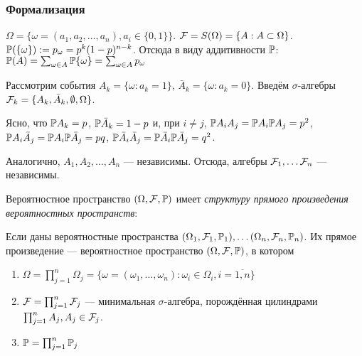 \subsubsection{Формализация}\label{ux444ux43eux440ux43cux430ux43bux438ux437ux430ux446ux438ux44f}

\({\Omega = \{ \omega = (a_1, a_2, \ldots, a_n), a_i\in \{0,1\} \}}\).\newline
\({\mathcal F = S(\Omega) = \{ A : A\subset\Omega\}}\).\newline
\({\mathbb P(\{\omega\}) := p_\omega = p^k (1-p)^{n-k}}\). Отсюда в виду
аддитивности \(\mathbb P\): \newline
\({\mathbb P(A) = \sum_{\omega\in A} \mathbb P \{\omega\} = \sum_{\omega\in A} p_{\omega}}\)

Рассмотрим события \(A_k = \{\omega: a_k = 1\}\),
\(\bar A_k = \{\omega: a_k = 0\}\).\newline
Введём \(\sigma\)-алгебры
\(\mathcal F_k = \{ A_k, \bar A_k, \emptyset, \Omega \}\).

Ясно, что \(\mathbb P A_k = p\), \(\mathbb P \bar A_k = 1-p\) и, при
\(i\neq j\),\newline
\(\mathbb P A_i A_j = \mathbb P A_i \mathbb P A_j = p^2\),\newline
\(\mathbb P A_i \bar A_j = \mathbb P A_i \mathbb P\bar A_j = pq\),\newline
\(\mathbb P \bar A_i \bar A_j = \mathbb P\bar A_i \mathbb P\bar A_j = q^2\).

Аналогично, \(A_1, A_2, \ldots, A_n\) --- независимы. Отсюда, алгебры
\(\mathcal F_1, \ldots \mathcal F_n\) --- независимы.

Вероятностное пространство \((\Omega,\mathcal F,\mathbb P)\) имеет
\emph{структуру прямого произведения вероятностных пространств}:

Если даны вероятностные пространства
\((\Omega_1, \mathcal F_1, \mathbb P_1), \ldots (\Omega_n, \mathcal F_n, \mathbb P_n)\).
Их прямое произведение --- вероятностное пространство
\((\Omega, \mathcal F, \mathbb P)\), в котором

\begin{enumerate}
\def\labelenumi{\arabic{enumi}.}

\item
  \(\Omega = \prod_{j=1}^n \Omega_j = \{ \omega=(\omega_1,\ldots,\omega_n): \omega_i\in\Omega_i, i=\overline{1,n} \}\)
\item
  \(\mathcal F = \prod_{j=1}^n \mathcal F_j\) --- минимальная
  \(\sigma\)-алгебра, порождённая цилиндрами
  \(\prod_{j=1}^n A_j, A_j\in\mathcal F_j\).
\item
  \(\mathbb P = \prod_{j=1}^n \mathbb P_j\)
\end{enumerate}

